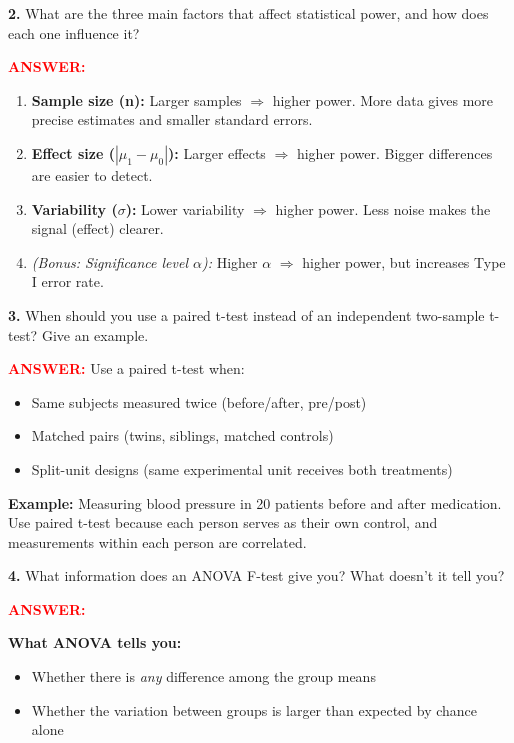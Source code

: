 \documentclass[11pt]{article}
\begin{document}
\vspace{0.5cm}

\textbf{2.} What are the three main factors that affect statistical power, and how does each one influence it?

\textcolor{red}{\textbf{ANSWER:}}
\begin{enumerate}
\item \textbf{Sample size (n):} Larger samples $\Rightarrow$ higher power. More data gives more precise estimates and smaller standard errors.
\item \textbf{Effect size ($|\mu_1 - \mu_0|$):} Larger effects $\Rightarrow$ higher power. Bigger differences are easier to detect.
\item \textbf{Variability ($\sigma$):} Lower variability $\Rightarrow$ higher power. Less noise makes the signal (effect) clearer.
\item \textit{(Bonus: Significance level $\alpha$):} Higher $\alpha$ $\Rightarrow$ higher power, but increases Type I error rate.
\end{enumerate}

\vspace{0.5cm}

\textbf{3.} When should you use a paired t-test instead of an independent two-sample t-test? Give an example.

\textcolor{red}{\textbf{ANSWER:}} Use a paired t-test when:
\begin{itemize}
\item Same subjects measured twice (before/after, pre/post)
\item Matched pairs (twins, siblings, matched controls)
\item Split-unit designs (same experimental unit receives both treatments)
\end{itemize}

\textbf{Example:} Measuring blood pressure in 20 patients before and after medication. Use paired t-test because each person serves as their own control, and measurements within each person are correlated.

\vspace{0.5cm}

\textbf{4.} What information does an ANOVA F-test give you? What doesn't it tell you?

\textcolor{red}{\textbf{ANSWER:}}

\textbf{What ANOVA tells you:}
\begin{itemize}
\item Whether there is \textit{any} difference among the group means
\item Whether the variation between groups is larger than expected by chance alone
\end{itemize}
\end{document}
